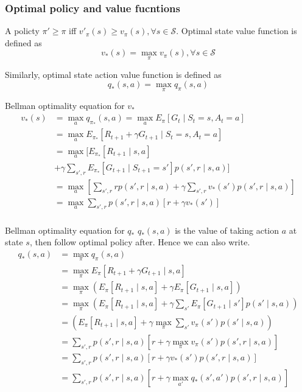 \documentclass[twocolumn, 10pt]{article}
\newcommand{\stateset}{\mathcal{S}}
\begin{document}
\subsubsection*{Optimal policy and value fucntions}

 A policty $\pi' \geq \pi$ iff  $v'_{\pi}(s) \geq v_{\pi}(s), \forall s \in \stateset$. Optimal state value function is defined as $$v_*(s) = \max_{\pi} v_{\pi}(s),  \forall s \in \stateset$$
 
 Similarly,  optimal state action value function is defined as $$ q_*(s, a) = \max_{\pi} q_{\pi}(s, a) $$
   
 Bellman optimality equation for $v_*$  
 $$
\begin{aligned}
v_*(s) & = \max_{a} q_{\pi_*}(s, a) =\max_a E_{\pi} [G_t \mid S_t = s, A_t = a] \\
            & = \max_{a} E_{\pi_*} [R_{t+ 1} + \gamma G_{t+1} \mid S_t = s, A_t = a] \\
            & = \max_{a} [  E_{\pi_*} [R_{t+ 1}  \mid s, a ]  \\
            & + \gamma   \sum_{s', r}  E_{\pi_*} [G_{t+1}  \mid S_{t+1} = s']p(s', r \mid  s, a)]  \\
            & = \max_{a} \left[  \sum_{s', r} r p(s', r \mid s, a)   + \gamma   \sum_{s', r}  v_*(s')p(s', r \mid  s, a) \right]  \\
            & = \max_{a} \sum_{s', r} p(s', r \mid s, a) [r + \gamma v_*(s')] \\
\end{aligned}
$$

Bellman optimality equation for $q_*$
 $q_*(s,a)$ is the value of taking action $a$ at state $s$, then follow optimal policy after. Hence we can also write.
$$ 
\begin{aligned}
q_*(s, a) &= \max_{\pi} q_{\pi} (s, a) \\
&= \max_{\pi} E_{\pi} [R_{t+1} + \gamma G_{t+1} \mid s, a] \\
& = \max_{\pi} \left( E_{\pi}[R_{t+1} \mid s, a]  + \gamma E_{\pi}[ G_{t+1}  \mid s, a]  \right)\\
&= \max_{\pi}  \left( E_{\pi}[R_{t+1} \mid s, a]  +  \gamma \sum_{s'} E_{\pi}[ G_{t+1} \mid s'] p(s' \mid s, a)  \right)\\
&=\left( E_{\pi}[R_{t+1} \mid s, a]  +  \gamma  \max_{\pi}   \sum_{s'} v_{\pi}(s') p(s' \mid s, a)  \right)\\
&= \sum_{s', r }  p(s', r \mid s, a) \left[ r +  \gamma  \max_{\pi}  v_{\pi}(s') p(s', r \mid s, a) \right] \\
&= \sum_{s', r }  p(s', r \mid s, a) \left[ r +  \gamma  v_{*}(s') p(s', r \mid s, a) \right] \\
&= \sum_{s', r }  p(s', r \mid s, a) \left[ r +  \gamma  \max_{a'} q_{*}(s', a') p(s', r \mid s, a) \right] \\
\end{aligned}$$
\end{document}
